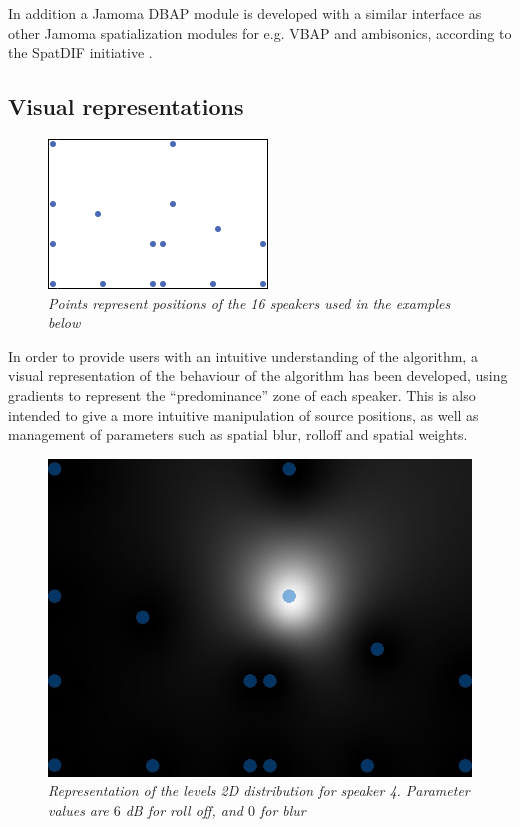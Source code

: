 \documentclass[twoside,10pt]{article}
\begin{document}
In addition a Jamoma DBAP module is developed with a similar interface as other Jamoma spatialization modules for e.g. VBAP and ambisonics, according to the SpatDIF initiative \cite{Peters:2008spatdif}.



\subsection{Visual representations}
\label{sec:visual_representation}

\begin{figure}[ht]
\centerline{\includegraphics[scale=0.8]{LoudspeakerPositions}}
\caption{{\it Points represent positions of the 16 speakers used in the examples below}}
\label{speaker_positions}
\end{figure}

In order to provide users with an intuitive understanding of the algorithm, a visual representation of the behaviour of the algorithm has been developed, using gradients to represent the ``predominance'' zone of each speaker. This is also intended to give a more intuitive manipulation of source positions, as well as management of parameters such as spatial blur, rolloff and spatial weights.

\begin{figure}[ht]
\centerline{\includegraphics[scale=0.5]{spk4_r_6_b_0}}
\caption{{\it Representation of the levels 2D distribution for speaker 4. Parameter values are $6$ dB for roll off, and $0$ for blur}}  
\label{fig:1spk}
\end{figure}
\end{document}
